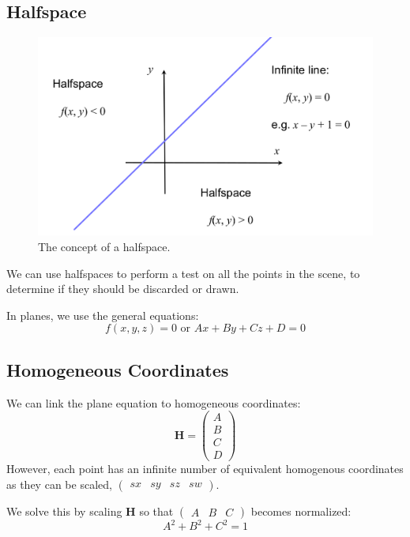 \documentclass[11pt]{article}
\begin{document}
\subsection{Halfspace}
\begin{figure}[htb!]
  \caption{The concept of a halfspace.}
  \includegraphics[scale=0.3]{halfspace}
  \centering
\end{figure}
We can use halfspaces to perform a test on all the points in the scene, to determine if they should be discarded or drawn.

In planes, we use the general equations:
\[
  f(x, y, z) = 0 \text{ or } Ax + By + Cz + D = 0
\]

\subsection{Homogeneous Coordinates}
We can link the plane equation to homogeneous coordinates:
\[
  \bm{H} = \begin{pmatrix} A \\ B \\ C \\ D \end{pmatrix}  
\]
However, each point has an infinite number of equivalent homogenous coordinates as they can be scaled, $\begin{pmatrix} sx & sy & sz & sw \end{pmatrix}$.

We solve this by scaling $\bm{H}$ so that $\begin{pmatrix} A & B & C \end{pmatrix}$ becomes normalized:
\[
  A^2 + B^2 + C^2 = 1  
\]
\end{document}
